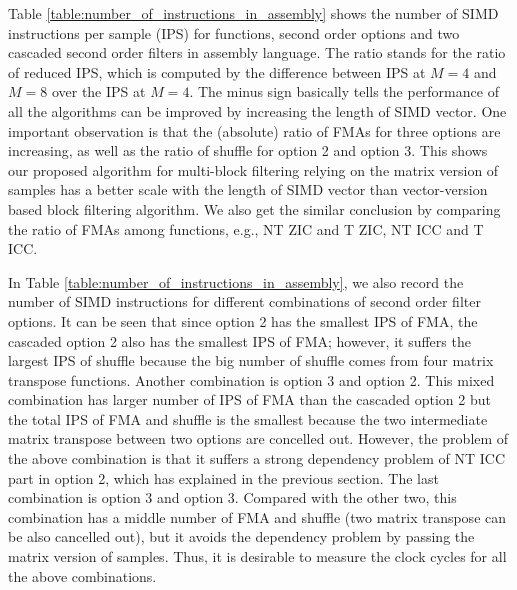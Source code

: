 Table \ref{table:number_of_instructions_in_assembly} shows the number of SIMD instructions per sample (IPS) for functions,
second order options and two cascaded second order filters in assembly language. 
The ratio stands for the ratio of reduced IPS,
which is computed by the difference 
between IPS at $M=4$ and $M=8$ over the IPS at $M=4$. 
The minus sign basically tells the performance
of all the algorithms can be improved by increasing the length of SIMD vector. 
One important observation is that the (absolute) ratio of FMAs for three options are increasing,
as well as the ratio of shuffle for option 2 and option 3. This shows our proposed algorithm for multi-block filtering 
relying on the matrix version of samples has a better scale with the length of SIMD vector than vector-version based block filtering algorithm.
We also get the similar conclusion by comparing the ratio of FMAs among functions, e.g., NT ZIC and T ZIC, NT ICC and T ICC.

In Table \ref{table:number_of_instructions_in_assembly}, we also record the number of SIMD instructions for different combinations of second order filter options.
It can be seen that since option 2 has the smallest IPS of FMA, the cascaded option 2 also has the smallest IPS of FMA; 
however, it suffers the largest IPS of shuffle because the big number of shuffle comes from four matrix transpose functions. 
Another combination is option 3 and option 2. This mixed combination has larger number of IPS of FMA than the cascaded option 2 but
the total IPS of FMA and shuffle is the smallest because the two intermediate matrix transpose between two options 
are concelled out.
However, the problem of the above combination is that
it suffers a strong dependency problem of NT ICC part in option 2, 
which has explained in the previous section. 
The last combination is option 3 and option 3. Compared with the other two, this combination has a middle number of FMA and shuffle (two matrix transpose can be also cancelled out),
but it avoids the dependency problem by passing the matrix version of samples.
Thus, it is desirable to measure the clock cycles for all the above combinations.


